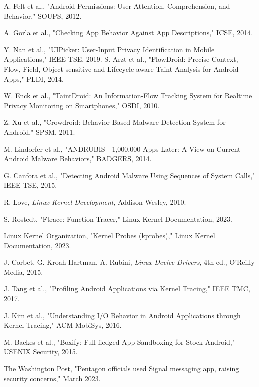 \documentclass[a4paper,12pt]{report}
\begin{document}
\begin{thebibliography}{99}
     A. Felt et al., "Android Permissions: User Attention, Comprehension, and Behavior," SOUPS, 2012.

     A. Gorla et al., "Checking App Behavior Against App Descriptions," ICSE, 2014.

     Y. Nan et al., "UIPicker: User-Input Privacy Identification in Mobile Applications," IEEE TSE, 2019.
     S. Arzt et al., "FlowDroid: Precise Context, Flow, Field, Object-sensitive and Lifecycle-aware Taint Analysis for Android Apps," PLDI, 2014.

     W. Enck et al., "TaintDroid: An Information-Flow Tracking System for Realtime Privacy Monitoring on Smartphones," OSDI, 2010.

     Z. Xu et al., "Crowdroid: Behavior-Based Malware Detection System for Android," SPSM, 2011.

     M. Lindorfer et al., "ANDRUBIS - 1,000,000 Apps Later: A View on Current Android Malware Behaviors," BADGERS, 2014.

     G. Canfora et al., "Detecting Android Malware Using Sequences of System Calls," IEEE TSE, 2015.

     R. Love, \textit{Linux Kernel Development}, Addison-Wesley, 2010.

     S. Rostedt, "Ftrace: Function Tracer," Linux Kernel Documentation, 2023.

     Linux Kernel Organization, "Kernel Probes (kprobes)," Linux Kernel Documentation, 2023.

     J. Corbet, G. Kroah-Hartman, A. Rubini, \textit{Linux Device Drivers}, 4th ed., O'Reilly Media, 2015.

     J. Tang et al., "Profiling Android Applications via Kernel Tracing," IEEE TMC, 2017.

     J. Kim et al., "Understanding I/O Behavior in Android Applications through Kernel Tracing," ACM MobiSys, 2016.

     M. Backes et al., "Boxify: Full-fledged App Sandboxing for Stock Android," USENIX Security, 2015.

     The Washington Post, "Pentagon officials used Signal messaging app, raising security concerns," March 2023.


\end{thebibliography}
\end{document}
